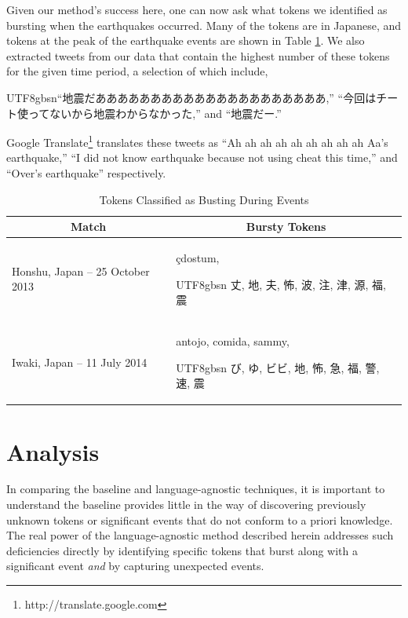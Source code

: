\documentclass{acm_proc_article-sp}
\newcommand{\myfont}{gbsn}
\begin{document}
Given our method's success here, one can now ask what tokens we identified as bursting when the earthquakes occurred.
Many of the tokens are in Japanese, and tokens at the peak of the earthquake events are shown in Table \ref{tab:japanTokens}.
We also extracted tweets from our data that contain the highest number of these tokens for the given time period, a selection of which include, \begin{CJK}{UTF8}{\myfont}``地震だあああああああああああああああああああああ,'' ``今回はチート使ってないから地震わからなかった,'' and ``地震だー.'' \end{CJK}
Google Translate\footnote{http://translate.google.com} translates these tweets as ``Ah ah ah ah ah ah ah ah ah Aa's earthquake,'' ``I did not know earthquake because not using cheat this time,'' and ``Over's earthquake'' respectively.

\begin{table}[htdp]
\caption{Tokens Classified as Busting During Events}
\begin{center}
\begin{tabular}{|p{1.45in} | p{1.45in} |}
\hline
\multicolumn{1}{|c|}{\textbf{Match}} & \multicolumn{1}{|c|}{\textbf{Bursty Tokens}} \\ \hline
Honshu, Japan -- 25 October 2013 & \c{c}dostum, \begin{CJK}{UTF8}{\myfont} 丈, 地, 夫, 怖, 波, 注, 津, 源, 福, 震 \end{CJK} \\ \hline
Iwaki, Japan -- 11 July 2014 & antojo, comida, sammy, \begin{CJK}{UTF8}{\myfont} び, ゆ, ビビ, 地, 怖, 急, 福, 警, 速, 震 \end{CJK} \\ \hline
\end{tabular}
\end{center}
\label{tab:japanTokens}
\end{table}

\section{Analysis}
\label{sect:analysis}

In comparing the baseline and language-agnostic techniques, it is important to understand the baseline provides little in the way of discovering previously unknown tokens or significant events that do not conform to a priori knowledge.
The real power of the language-agnostic method described herein addresses such deficiencies directly by identifying specific tokens that burst along with a significant event \emph{and} by capturing unexpected events.
\end{document}
